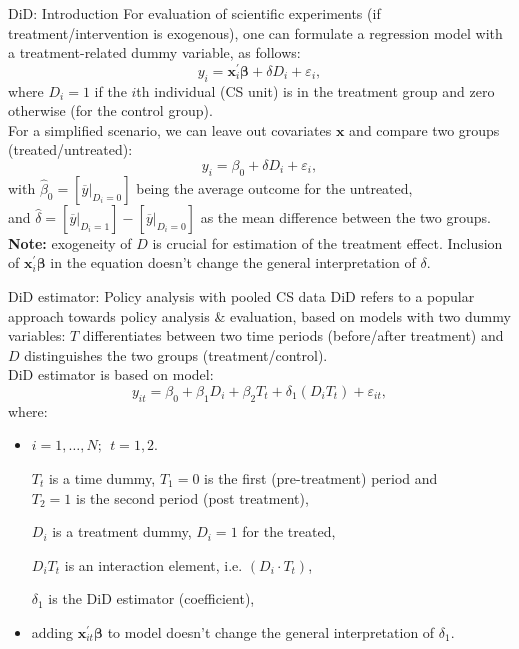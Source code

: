 \documentclass{beamer}
\begin{document}
\begin{frame}{DiD: Introduction}
\small
For evaluation of scientific experiments (if treatment/intervention is exogenous), one can formulate a regression model with a treatment-related dummy variable, as follows:
$$
y_i = \bm{x}_i^{\prime}\bm{\beta} + \delta D_i + \varepsilon_i,
$$
where $D_i = 1$ if the $i$th individual (CS unit) is in the treatment group and zero otherwise (for the control group). \\
\medskip
For a simplified scenario, we can leave out covariates $\bm{x}$ and compare two groups (treated/untreated):
$$
y_i = \beta_0 + \delta D_i + \varepsilon_i,
$$    
with $\hat{\beta}_0 = [\overline{y}|_{D_i=0}]$ being the average outcome for the untreated,\\
and $\hat{\delta} = [\overline{y}|_{D_i=1}] - [\overline{y}|_{D_i=0}]$ as the mean difference between the two groups.\\
\bigskip
\textbf{Note:} exogeneity of $D$ is crucial for estimation of the treatment effect. Inclusion of $\bm{x}_i^{\prime}\bm{\beta}$ in the equation doesn't change the general interpretation of $\delta$.
\end{frame}

\begin{frame}{DiD estimator: Policy analysis with pooled CS data} 
\small
DiD refers to a popular approach towards policy analysis \& evaluation, based on models with two dummy variables: $T$ differentiates between two time periods (before/after treatment) and $D$ distinguishes the two groups (treatment/control). \\ \medskip 
DiD estimator is based on model: \\ 
$$y_{it}=\beta_0 + \beta_1 D_i + \beta_2 T_t + \delta_1 (D_i T_t) + \varepsilon_{it},$$
where:
\begin{itemize}
\item $i=1, \dots, N;~~t=1,2$. \\
\item[$T_t$] is a time dummy, $T_1=0$ is the first (pre-treatment) period and \\$T_2 = 1$ is the second period (post treatment),
\item[$D_i$] is a treatment dummy, $D_i=1$ for the treated,
\item[$D_i T_t$] is an interaction element, i.e. $(D_i\! \cdot \! T_t)$,
\item[$\delta_1$] is the DiD estimator (coefficient),
\item adding $\bm{x}_{it}^{\prime}\bm{\beta}$ to model doesn't change the general interpretation of $\delta_1$.
\end{itemize}
\end{frame}
\end{document}
